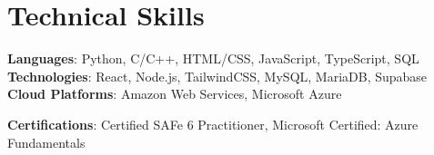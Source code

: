 \documentclass[letterpaper,11pt]{article}
\newcommand{\resumeSubHeadingListStart}{\begin{itemize}[leftmargin=0.0in, label={}]}
\newcommand{\resumeSubHeadingListEnd}{\end{itemize}}
\begin{document}
\begin{comment}
\section{Relevant Coursework}
        \begin{multicols}{4}
            \begin{itemize}[itemsep=-5pt, parsep=3pt]
                \item\small Data Structures
                \item Software Methodology
                \item Algorithms Analysis
                \item Database Management
                \item Artificial Intelligence
                \item Internet Technology
                \item Systems Programming
                \item Computer Architecture
            \end{itemize}
        \end{multicols}
        \vspace*{2.0\multicolsep}
\end{comment}

\section{Technical Skills}
 \begin{itemize}[leftmargin=0.15in, label={}]
    \small{\item{
     \textbf{Languages}{: Python, C/C++, HTML/CSS, JavaScript, TypeScript, SQL} \\
    \textbf{Technologies}{: React, Node.js, TailwindCSS, MySQL, MariaDB, Supabase} \\
     \textbf{Cloud Platforms}{: Amazon Web Services, Microsoft Azure} \\
     \begin{comment} 
    \textbf{Offensive/Defensive Security Tools}{: Metasploit, Burp Suite, Nmap, Wireshark, Ghidra, GDB+GEF, Radare2} \\
    \end{comment}  
    \textbf{Certifications}{: Certified SAFe 6 Practitioner, Microsoft Certified: Azure Fundamentals} \\
    }}
 \end{itemize}
 \vspace{-16pt}
\end{document}
